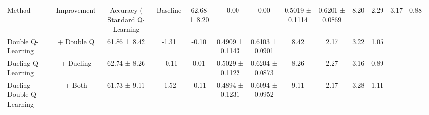 \begin{tabular}{lccccccccccc}
\toprule
Method & Improvement & Accuracy (%
\midrule
Standard Q-Learning & Baseline & 62.68 ± 8.20 & +0.00 & 0.00 & 0.5019 ± 0.1114 & 0.6201 ± 0.0869 & 8.20 & 2.29 & 3.17 & 0.88 \\
Double Q-Learning & + Double Q & 61.86 ± 8.42 & -1.31 & -0.10 & 0.4909 ± 0.1143 & 0.6103 ± 0.0901 & 8.42 & 2.17 & 3.22 & 1.05 \\
Dueling Q-Learning & + Dueling & 62.74 ± 8.26 & +0.11 & 0.01 & 0.5029 ± 0.1122 & 0.6204 ± 0.0873 & 8.26 & 2.27 & 3.16 & 0.89 \\
Dueling Double Q-Learning & + Both & 61.73 ± 9.11 & -1.52 & -0.11 & 0.4894 ± 0.1231 & 0.6094 ± 0.0952 & 9.11 & 2.17 & 3.28 & 1.11 \\
\bottomrule
\end{tabular}
